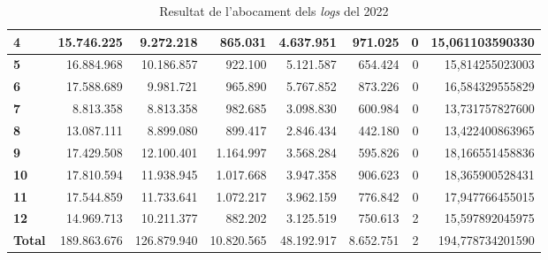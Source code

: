 \begin{table}[h!]
\begin{adjustbox}{width=1.2\textwidth, center}
\begin{tabular}{|l|r|r|r|r|r|r|r|}
            \textbf{4}     & 15.746.225  & 9.272.218   & 865.031    & 4.637.951  & 971.025   & 0 & 15,061103590330  \\
            \midrule
            \textbf{5}     & 16.884.968  & 10.186.857  & 922.100    & 5.121.587  & 654.424   & 0 & 15,814255023003  \\
            \textbf{6}     & 17.588.689  & 9.981.721   & 965.890    & 5.767.852  & 873.226   & 0 & 16,584329555829  \\
            \textbf{7}     & 8.813.358   & 8.813.358   & 982.685    & 3.098.830  & 600.984   & 0 & 13,731757827600  \\
            \textbf{8}     & 13.087.111  & 8.899.080   & 899.417    & 2.846.434  & 442.180   & 0 & 13,422400863965  \\
            \midrule
            \textbf{9}     & 17.429.508  & 12.100.401  & 1.164.997  & 3.568.284  & 595.826   & 0 & 18,166551458836  \\
            \textbf{10}    & 17.810.594  & 11.938.945  & 1.017.668  & 3.947.358  & 906.623   & 0 & 18,365900528431  \\
            \textbf{11}    & 17.544.859  & 11.733.641  & 1.072.217  & 3.962.159  & 776.842   & 0 & 17,947766455015  \\
            \textbf{12}    & 14.969.713  & 10.211.377  & 882.202    & 3.125.519  & 750.613   & 2 & 15,597892045975  \\
            \midrule
            \textbf{Total} & 189.863.676 & 126.879.940 & 10.820.565 & 48.192.917 & 8.652.751 & 2 & 194,778734201590 \\
            \bottomrule
        \end{tabular}
    \end{adjustbox}
    \caption{Resultat de l'abocament dels \textit{logs} del 2022}
    \label{tab:logs-table-2022}
\end{table}
